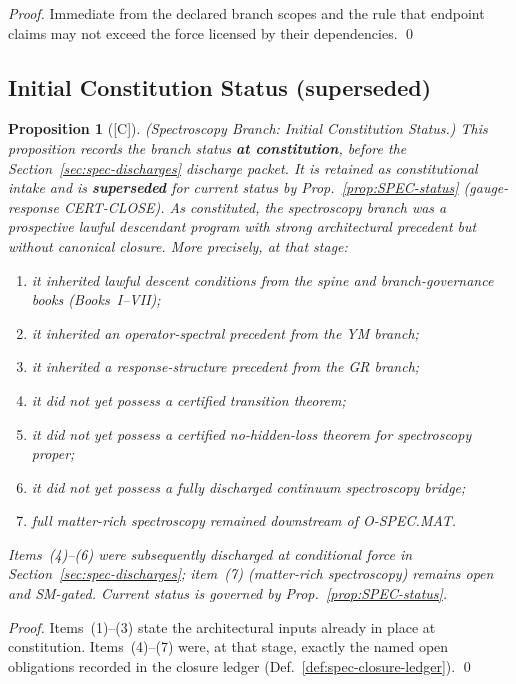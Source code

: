 \documentclass[12pt,oneside]{amsbook}
\theoremstyle{plain}
\newtheorem{proposition}[theorem]{Proposition}
\theoremstyle{definition}
\theoremstyle{remark}
\newcommand{\status}[1]{\textup{[#1]}}
\begin{document}
\begin{proof}
Immediate from the declared branch scopes and the rule that endpoint claims
may not exceed the force licensed by their dependencies. \qed
\end{proof}

\subsection{Initial Constitution Status (superseded)}\label{sec:spec-current-status}

\begin{proposition}[\status{C}]\label{prop:spec-current-status}
\textup{(Spectroscopy Branch: Initial Constitution Status.)}
\emph{This proposition records the branch status \textbf{at constitution},
before the Section~\ref{sec:spec-discharges} discharge packet. It is
retained as constitutional intake and is \textbf{superseded} for current
status by Prop.~\ref{prop:SPEC-status} (gauge-response CERT-CLOSE).}
As constituted, the spectroscopy branch was a prospective lawful descendant
program with strong architectural precedent but without canonical closure.
More precisely, at that stage:
\begin{enumerate}[label=\textup{(\arabic*)}]
 \item it inherited lawful descent conditions from the spine and
 branch-governance books (Books~I--VII);
 \item it inherited an operator-spectral precedent from the YM branch;
 \item it inherited a response-structure precedent from the GR branch;
 \item it did not yet possess a certified transition theorem;
 \item it did not yet possess a certified no-hidden-loss theorem for
 spectroscopy proper;
 \item it did not yet possess a fully discharged continuum spectroscopy
 bridge;
 \item full matter-rich spectroscopy remained downstream of O-SPEC.MAT.
\end{enumerate}
Items~(4)--(6) were subsequently discharged at conditional force in
Section~\ref{sec:spec-discharges}; item~(7) (matter-rich spectroscopy)
remains open and SM-gated. Current status is governed by
Prop.~\ref{prop:SPEC-status}.
\end{proposition}

\begin{proof}
Items~(1)--(3) state the architectural inputs already in place at
constitution. Items~(4)--(7) were, at that stage, exactly the named open
obligations recorded in the closure ledger (Def.~\ref{def:spec-closure-ledger}). \qed
\end{proof}
\end{document}
